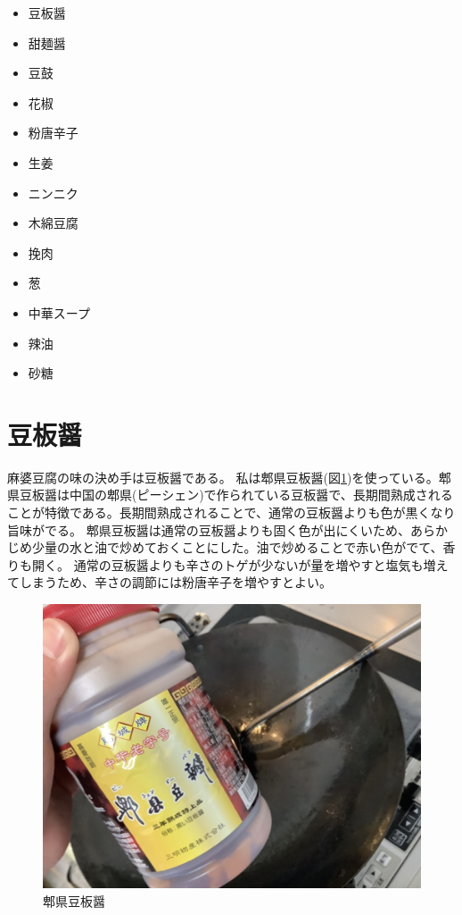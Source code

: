 \documentclass[a4paper,10pt,xelatex,ja=standard,twocolumn]{bxjsarticle}
\begin{document}
\begin{itemize}
  \item 豆板醤
  \item 甜麺醤
  \item 豆鼓
  \item 花椒
  \item 粉唐辛子
  \item 生姜
  \item ニンニク
  \item 木綿豆腐
  \item 挽肉
  \item 葱
  \item 中華スープ
  \item 辣油
  \item 砂糖
\end{itemize}

\section{豆板醤}

麻婆豆腐の味の決め手は豆板醤である。
私は郫県豆板醤(図\ref{tobanjan})を使っている。郫県豆板醤は中国の郫県(ピーシェン)で作られている豆板醤で、長期間熟成されることが特徴である。長期間熟成されることで、通常の豆板醤よりも色が黒くなり旨味がでる。
郫県豆板醤は通常の豆板醤よりも固く色が出にくいため、あらかじめ少量の水と油で炒めておくことにした。油で炒めることで赤い色がでて、香りも開く。
通常の豆板醤よりも辛さのトゲが少ないが量を増やすと塩気も増えてしまうため、辛さの調節には粉唐辛子を増やすとよい。


\begin{figure}[h]
  \caption{郫県豆板醤 \cite{2}}
  \label{tobanjan}
  \begin{center}
    \includegraphics[width=\linewidth]{IMG_4092.jpg}
  \end{center}
\end{figure}
\end{document}
